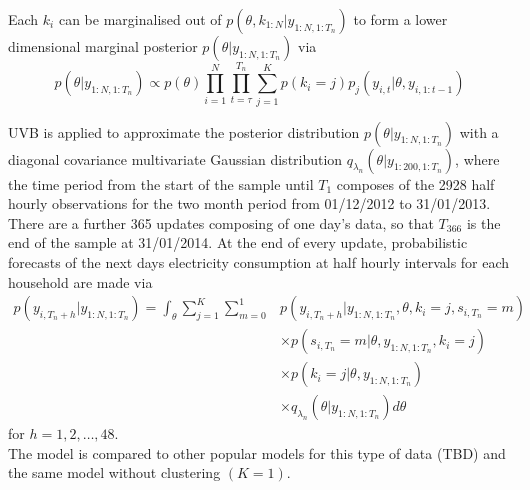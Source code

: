 \documentclass[12pt,a4paper]{article}\usepackage[]{graphicx}\usepackage[]{color}
\begin{document}
Each $k_i$ can be marginalised out of $p(\theta, k_{1:N} | y_{1:N, 1:T_n})$ to form a lower dimensional marginal posterior $p(\theta | y_{1:N, 1:T_n})$ via
\begin{equation}
p(\theta | y_{1:N, 1:T_n}) \propto p(\theta)  \prod_{i=1}^N\prod_{t=\tau}^{T_n}\sum_{j=1}^K p(k_i = j)p_{j}(y_{i, t} | \theta, y_{i, 1:t-1})
\end{equation}

UVB is applied to approximate the posterior distribution $p(\theta | y_{1:N, 1:T_n})$ with a diagonal covariance multivariate Gaussian distribution $q_{\lambda_n}(\theta | y_{1:200, 1:T_n})$, where the time period from the start of the sample until $T_1$ composes of the 2928 half hourly observations for the two month period from 01/12/2012 to 31/01/2013. There are a further 365 updates composing of one day's data, so that $T_366$ is the end of the sample at 31/01/2014. At the end of every update, probabilistic forecasts of the next days electricity consumption at half hourly intervals for each household are made via
\begin{align}
p(y_{i, T_n+h} | y_{1:N, 1:T_n}) = \int_{\theta} \sum_{j=1}^K \sum_{m=0}^1 &p(y_{i, T_n+h} | y_{1:N, 1:T_n}, \theta, k_i = j, s_{i, T_n} = m) \nonumber \\
&\times p(s_{i, T_n} = m | \theta, y_{1:N, 1:T_n}, k_i = j) \nonumber \\
&\times p(k_i = j | \theta, y_{1:N, 1:T_n}) \nonumber \\
&\times q_{\lambda_n}(\theta | y_{1:N, 1:T_n}) d\theta 
\end{align}
for $h = 1, 2, \ldots, 48$.
\\

The model is compared to other popular models for this type of data (TBD) and the same model without clustering $(K = 1)$.



\end{document}
